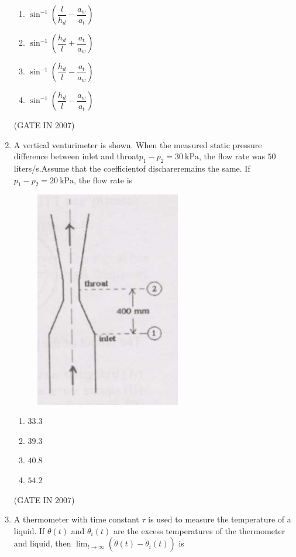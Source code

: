 \documentclass[journal]{IEEEtran}
\begin{document}
\begin{enumerate}
\begin{multicols}{2}
\begin{enumerate}
\item $ \sin^{-1} \left( \dfrac{l}{h_d} - \dfrac{a_w}{a_t} \right) $
\item $ \sin^{-1} \left( \dfrac{h_d}{l} + \dfrac{a_t}{a_w} \right) $
\item $ \sin^{-1} \left( \dfrac{h_d}{l} - \dfrac{a_t}{a_w} \right) $
\item $ \sin^{-1} \left( \dfrac{h_d}{l} - \dfrac{a_w}{a_t} \right) $
\end{enumerate}
\end{multicols}
\hfill(GATE IN 2007)
\item A vertical venturimeter is shown. When the measured static pressure difference between inlet and throat$p_1 - p_2 = 30\ \mathrm{kPa}$, the flow rate was $50$ liters/s.Assume that the coefficientof dischareremains the same.
If $p_1 - p_2 = 20\ \mathrm{kPa}$, the flow rate is  
\begin{figure}[H]
    \centering
      \includegraphics[width=0.6\textwidth]{27.jpg} 
      \caption{}
\label{fig:fig27} 
\end{figure}
\begin{multicols}{4}
\begin{enumerate}
\item $33.3$  
\item $39.3$  
\item $40.8$  
\item $54.2$  
\end{enumerate}
\end{multicols}
\hfill(GATE IN 2007)
\item A thermometer with time constant $\tau$ is used to measure the temperature of a liquid. If $\theta(t)$ and $\theta_i(t)$ are the excess temperatures of the thermometer and liquid, then $\lim_{t\to \infty} (\dot{\theta}(t) - \dot{\theta}_i(t))$ is  


\end{enumerate}
\end{document}
